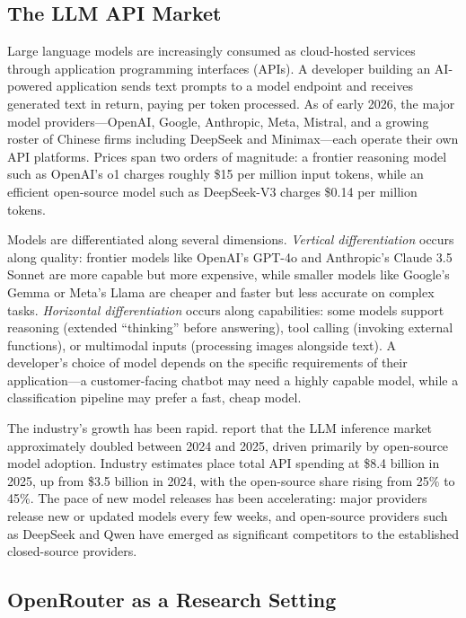\documentclass[11pt, a4paper]{article}
\begin{document}
\subsection{The LLM API Market}

Large language models are increasingly consumed as cloud-hosted services through application programming interfaces (APIs). A developer building an AI-powered application sends text prompts to a model endpoint and receives generated text in return, paying per token processed. As of early 2026, the major model providers---OpenAI, Google, Anthropic, Meta, Mistral, and a growing roster of Chinese firms including DeepSeek and Minimax---each operate their own API platforms. Prices span two orders of magnitude: a frontier reasoning model such as OpenAI's o1 charges roughly \$15 per million input tokens, while an efficient open-source model such as DeepSeek-V3 charges \$0.14 per million tokens.

Models are differentiated along several dimensions. \emph{Vertical differentiation} occurs along quality: frontier models like OpenAI's GPT-4o and Anthropic's Claude 3.5 Sonnet are more capable but more expensive, while smaller models like Google's Gemma or Meta's Llama are cheaper and faster but less accurate on complex tasks. \emph{Horizontal differentiation} occurs along capabilities: some models support reasoning (extended ``thinking'' before answering), tool calling (invoking external functions), or multimodal inputs (processing images alongside text). A developer's choice of model depends on the specific requirements of their application---a customer-facing chatbot may need a highly capable model, while a classification pipeline may prefer a fast, cheap model.

The industry's growth has been rapid. \citet{demirer2025emerging} report that the LLM inference market approximately doubled between 2024 and 2025, driven primarily by open-source model adoption. Industry estimates place total API spending at \$8.4 billion in 2025, up from \$3.5 billion in 2024, with the open-source share rising from 25\% to 45\%. The pace of new model releases has been accelerating: major providers release new or updated models every few weeks, and open-source providers such as DeepSeek and Qwen have emerged as significant competitors to the established closed-source providers.

\subsection{OpenRouter as a Research Setting}
\end{document}
